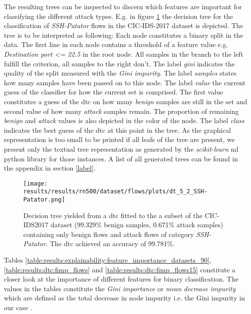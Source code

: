 The resulting trees can be inspected to discern which features are important for classifying the different attack types. E.g. in figure \ref{fig:results:dtc:cic2017:ssh_patator} the decision tree for the classification of \textit{SSH-Patator} flows in the CIC-IDS-2017 dataset is depicted. The tree is to be interpreted as following: Each node constitutes a binary split in the data. The first line in each node contains a threshold of a feature value e.g. \textit{Destination port <= 22.5} in the root node. All samples in the branch to the left fulfill the criterion, all samples to the right don't. The label \textit{gini} indicates the quality of the split measured with the \textit{Gini impurity}. The label \textit{samples} states how many samples have been passed on to this node. The label \textit{value} the current guess of the classifier for how the current set is comprised. The first value constitutes a guess of the \gls{dtc} on how many \textit{benign} samples are still in the set and second value of how many \textit{attack} samples remain. The proportion of remaining \textit{benign} and \textit{attack} values is also depicted in the color of the node. The label \textit{class} indicates the best guess of the \gls{dtc} at this point in the tree. As the graphical representation is too small to be printed if all leafs of the tree are present, we present only the textual tree representation as generated by the \textit{scikit-learn} \gls{ml} python library \cite{sklearn} for those instances. A list of all generated trees can be found in the appendix in section \ref{label}. \par

\begin{figure}[]
	\centering
	\texttt{[image: results/results/rn500/dataset/flows/plots/dt\_5\_2\_SSH-Patator.png]}
	\caption{Decision tree yielded from a \gls{dtc} fitted to the a subset of the CIC-IDS2017 dataset (99.329\% benign samples, 0.671\% attack samples) containing only benign flows and attack flows of category \textit{SSH-Patator}. The \gls{dtc} achieved an accuracy of 99.781\%.}
	\label{fig:results:dtc:cic2017:ssh_patator}
\end{figure}

Tables \ref{table:results:explainability:feature_importance_datasets_90}, \ref{table:results:dtc:fimp_flows} and \ref{table:results:dtc:fimp_flows15} constitute a closer look at the importance of different features for binary classification. The values in the tables constitute the \textit{Gini importance} or \textit{mean decrease impurity} which are defined as the total decrease in node impurity i.e. the Gini impurity in our case \cite{sklearn}. \par

